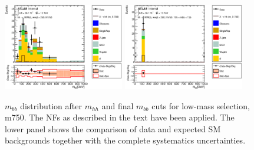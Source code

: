 \begin{figure}[!h]
\begin{center}
\includegraphics*[width=0.47\textwidth] {figures/Unblinded_mbb/C_reOpt700_mww_bbpt210_wwpt250_hh750_bbMass_regionA_met25d020.eps}
\includegraphics*[width=0.47\textwidth] {figures/Unblinded_mbb/C_reOpt700_mww_bbpt210_wwpt250_hh750_mbb_bbMass_regionA_met25d020.eps}
\caption[$m_{bb}$ distribution after $m_{hh}$ and final $m_{bb}$ cuts for low-mass selection, m750.]{$m_{bb}$ distribution after $m_{hh}$ and final $m_{bb}$ cuts for low-mass selection, m750. The NFs as described in the text have been applied. The lower panel shows the comparison of data and expected SM backgrounds together with the complete systematics uncertainties.}
\end{center}
\end{figure}

